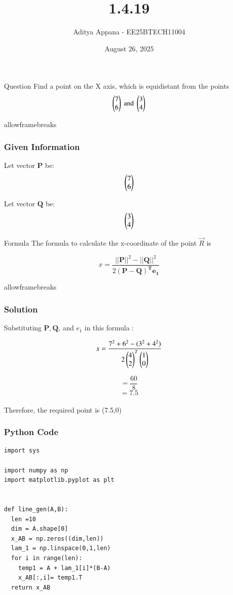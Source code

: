 \documentclass{beamer}
\title %
{1.4.19}
\date{August 26, 2025}
\author %
{Aditya Appana - EE25BTECH11004}
\begin{document}
\frame{\titlepage}
\begin{frame}{Question}
Find a point on the X axis, which is equidistant from the points 
\begin{align*}
\myvec{ 7 \\ 6 }\text{ and }\myvec{3 \\ 4}
\end{align*}

\end{frame}
\begin{frame}{allowframebreaks}
\frametitle{Given Information}

    \centering
    
    \label{tab:parameters}
    
    
    Let vector $\mathbf{P}$ be: \begin{align}
    \myvec{ 7\\6 }
    \end{align}
    

    Let vector $\mathbf{Q}$ be: \begin{align}\myvec{ 3\\4}\end{align}
    \label{0.2}

   
\end{frame}


\begin{frame}{Formula}
The formula to calculate the x-coordinate of the point $\vec{R}$ is

\vspace{1cm}

$$x= \frac{ ||\mathbf{P}||^2 - ||\mathbf{Q}||^2 }{2\mathbf{(P-Q)^T e_1}}$$

\end{frame}

\begin{frame}{allowframebreaks}
\frametitle{Solution}

    Substituting $\mathbf{P, Q}$, and $e_1$ in this formula :


$$x = \frac{7^2+6^2-(3^2+4^2)}{2 \myvec{4 \\ 2}^T \myvec{1\\0}}$$


$$=\frac{60}{8}$$
$$= 7.5$$ \\

Therefore, the required point is (7.5,0)
\end{frame}




\begin{frame}[fragile]
    \frametitle{Python Code}
    \begin{lstlisting}
import sys 

import numpy as np
import matplotlib.pyplot as plt


def line_gen(A,B):
  len =10
  dim = A.shape[0]
  x_AB = np.zeros((dim,len))
  lam_1 = np.linspace(0,1,len)
  for i in range(len):
    temp1 = A + lam_1[i]*(B-A)
    x_AB[:,i]= temp1.T
  return x_AB
\end{lstlisting}
\end{frame}
\end{document}
